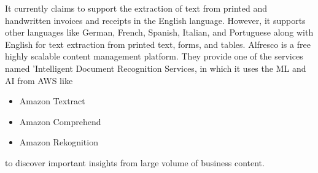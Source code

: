 It currently claims to support the extraction of text from printed and handwritten invoices and receipts in the English language. However, it supports other languages like German, French, Spanish, Italian, and Portuguese along with English for text extraction from printed text, forms, and tables\cite{amazonLang}. Alfresco\cite{alfresco} is a free highly scalable content management platform. They provide one of the services named 'Intelligent Document Recognition Services, in which it uses the \acs{ML} and \acs{AI} from \ac{AWS} like
\begin{itemize}
    \item Amazon Textract\cite{urlAmazonTextract}
    \item Amazon Comprehend\cite{amazonComprehend}
    \item Amazon Rekognition\cite{amazonRekognition}
\end{itemize}to discover important insights from large volume of business content\cite{alfrescoAI}.


